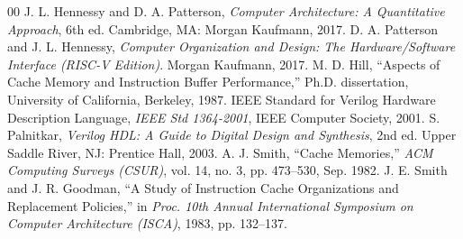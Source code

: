 \documentclass[10pt,twocolumn]{article}
\begin{document}
\begin{thebibliography}{00}
 J. L. Hennessy and D. A. Patterson, \textit{Computer Architecture: A Quantitative Approach}, 6th ed. Cambridge, MA: Morgan Kaufmann, 2017.
 D. A. Patterson and J. L. Hennessy, \textit{Computer Organization and Design: The Hardware/Software Interface (RISC-V Edition)}. Morgan Kaufmann, 2017.
 M. D. Hill, ``Aspects of Cache Memory and Instruction Buffer Performance,'' Ph.D. dissertation, University of California, Berkeley, 1987.
 IEEE Standard for Verilog Hardware Description Language, \textit{IEEE Std 1364-2001}, IEEE Computer Society, 2001.
 S. Palnitkar, \textit{Verilog HDL: A Guide to Digital Design and Synthesis}, 2nd ed. Upper Saddle River, NJ: Prentice Hall, 2003.
 A. J. Smith, ``Cache Memories,'' \textit{ACM Computing Surveys (CSUR)}, vol. 14, no. 3, pp. 473--530, Sep. 1982.
 J. E. Smith and J. R. Goodman, ``A Study of Instruction Cache Organizations and Replacement Policies,'' in \textit{Proc. 10th Annual International Symposium on Computer Architecture (ISCA)}, 1983, pp. 132--137.
\end{thebibliography}
\end{document}
